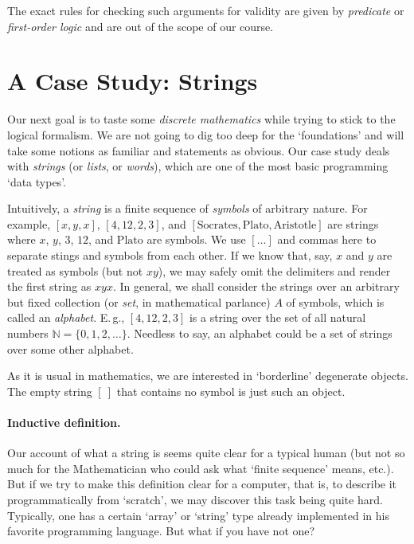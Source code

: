 \documentclass[12pt,notitlepage]{article}
\theoremstyle{plain}
\theoremstyle{definition}
\theoremstyle{plain}
\newcommand{\N}{\mathbb{N}}
\newcommand{\1}{\mathbf{1}}
\newcommand{\0}{\mathbf{0}}
\newcommand{\mcomm}[1]{}
\begin{document}
The exact rules for checking such arguments for validity are given by \emph{predicate} or \emph{first-order logic} and are out of the scope of our course.

\section{A Case Study: Strings}\label{sect:strings}

\mcomm{This section introduces an `inductive type' of strings without much `foundational' explanation. The main goal is to present the ideas of induction and recursion (which we looked upon as the heart of `discrete mathematics') without boring traditional examples of summing consecutive naturals, etc. We see this especially useful when the students have some (functional) programming experience. This section has few (if any) dependencies in the Course and may thus be freely omitted.}

Our next goal is to taste some \emph{discrete mathematics} while trying to stick to the logical formalism. We are not going to dig too deep for the `foundations' and will take some notions as familiar and statements as obvious. Our case study deals with \emph{strings} (or \emph{lists}, or \emph{words}), which are one of the most basic programming `data types'.

Intuitively, a \emph{string} is a finite sequence of \emph{symbols} of arbitrary nature. For example, $[x, y, x]$, $[4, 12, 2, 3]$, and $[\mbox{Socrates}, \mbox{Plato}, \mbox{Aristotle}]$ are strings where $x$, $y$, $3$, $12$, and $\mbox{Plato}$ are symbols. We use $[\ldots]$ and commas here to separate stings and symbols from each other. If we know that, say, $x$ and $y$ are treated as symbols (but not $xy$), we may safely omit the delimiters and render the first string as $xyx$. In general, we shall consider the strings over an arbitrary but fixed collection (or \emph{set}, in mathematical parlance) $A$ of symbols, which is called an \emph{alphabet}. E.\,g., $[4, 12, 2, 3]$ is a string over the set of all natural numbers $\N = \{0,1,2,\ldots\}$. Needless to say, an alphabet could be a set of strings over some other alphabet.

As it is usual in mathematics, we are interested in `borderline' degenerate objects. The empty string $[\ ]$ that contains no symbol is just such an object.

\paragraph{Inductive definition.} Our account of what a string is seems quite clear for a typical human (but not so much for the Mathematician who could ask what `finite sequence' means, etc.). But if we try to make this definition clear for a computer, that is, to describe it programmatically from `scratch', we may discover this task being quite hard. Typically, one has a certain `array' or `string' type already implemented in his favorite programming language. But what if you have not one?
\end{document}
